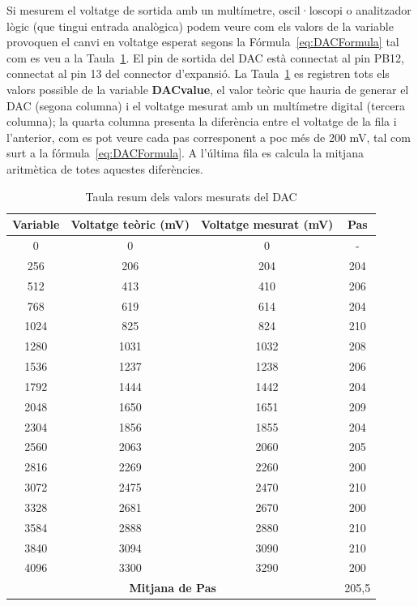 Si mesurem el voltatge de sortida amb un multímetre, oscil·loscopi o analitzador lògic (que tingui entrada analògica) podem veure com els valors de la variable provoquen el canvi en voltatge esperat segons la Fórmula~\ref{eq:DACFormula} tal com es veu a la Taula~\ref{tb:DACVoltages}. El pin de sortida del DAC està connectat al pin PB12, connectat al pin 13 del connector d'expansió. La Taula~\ref{tb:DACVoltages} es registren tots els valors possible de la variable {\bf DACvalue}, el valor teòric que hauria de generar el DAC (segona columna) i el voltatge mesurat amb un multímetre digital (tercera columna); la quarta columna presenta la diferència entre el voltatge de la fila i l'anterior, com es pot veure cada pas corresponent a poc més de 200 mV, tal com surt a la fórmula~\ref{eq:DACFormula}. A l'última fila es calcula la mitjana aritmètica de totes aquestes diferències.


\begin{table}
\caption{Taula resum dels valors mesurats del DAC}
\centering
\begin{tabular}{|c|c|c|c|}
\hline
{\bf Variable} & {\bf Voltatge teòric (mV)} & {\bf Voltatge mesurat (mV)} & {\bf Pas}\\
\hline
0 & 0 & 0 & - \\
256	& 206 & 204 & 204 \\
512	& 413 & 410 & 206 \\
768	& 619 & 614 & 204 \\
1024	& 825 & 824 & 210 \\
1280	& 1031 & 1032 & 208 \\
1536	& 1237 & 1238 & 206 \\
1792	& 1444 & 1442 & 204 \\
2048	& 1650 & 1651 & 209 \\
2304	& 1856 &1855 & 204 \\
2560	& 2063 & 2060 & 205 \\
2816	& 2269 & 2260 & 200 \\
3072	& 2475 & 2470 & 210 \\
3328	& 2681 & 2670 & 200 \\
3584	& 2888 & 2880 & 210 \\
3840	& 3094 & 3090 & 210 \\
4096	& 3300 & 3290 & 200 \\
\hline
\multicolumn{3}{|c|}{\bf Mitjana de Pas} & 205,5 \\
\hline
\end{tabular}
\label{tb:DACVoltages}
\end{table}

